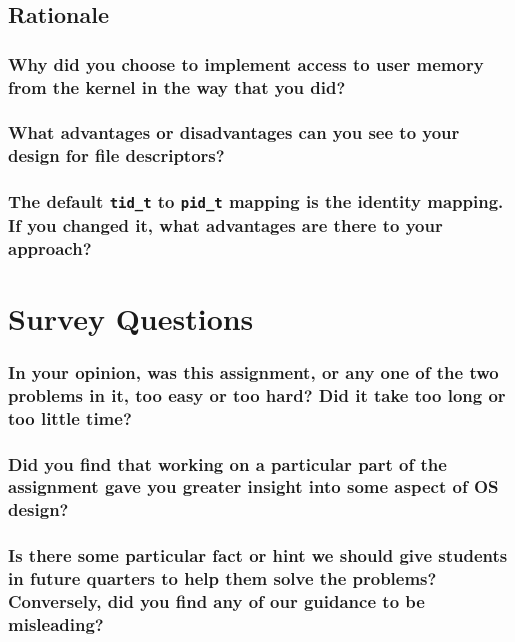 \documentclass[sigconf, nonacm, balance=false, urlbreakonhyphens=true]{acmart}
\begin{document}
        \subsection{Rationale}

            \subsubsection{Why did you choose to implement access to user memory from the kernel in the way that you did? }

            \subsubsection{What advantages or disadvantages can you see to your design for file descriptors? }

            \subsubsection{The default \texttt{tid\_t} to \texttt{pid\_t} mapping is the identity mapping.  If you changed it, what advantages are there to your approach? }
    
    \section{Survey Questions}


        \subsubsection*{In your opinion, was this assignment, or any one of the two problems in it, too easy or too hard? Did it take too long or too little time? }

        \subsubsection*{Did you find that working on a particular part of the assignment gave you greater insight into some aspect of OS design? }

        \subsubsection*{Is there some particular fact or hint we should give students in future quarters to help them solve the problems? Conversely, did you find any of our guidance to be misleading? }
\end{document}

